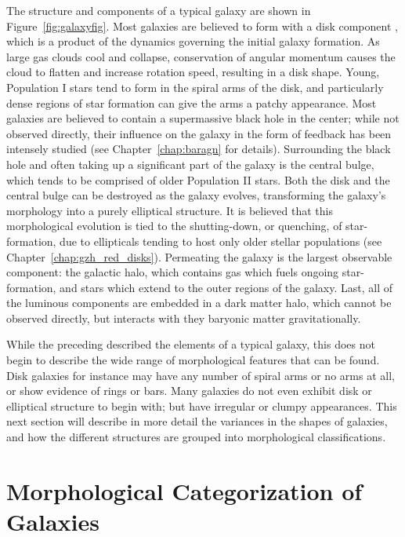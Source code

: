 The structure and components of a typical galaxy are shown in Figure~\ref{fig:galaxyfig}. Most galaxies are believed to form with a disk component \citep{Kormendy2004}, which is a product of the dynamics governing the initial galaxy formation. As large gas clouds cool and collapse, conservation of angular momentum causes the cloud to flatten and increase rotation speed, resulting in a disk shape. Young, Population I stars tend to form in the spiral arms of the disk, and particularly dense regions of star formation can give the arms a patchy appearance. Most galaxies are believed to contain a supermassive black hole in the center; while not observed directly, their influence on the galaxy in the form of feedback has been intensely studied (see Chapter~\ref{chap:baragn} for details). Surrounding the black hole and often taking up a significant part of the galaxy is the central bulge, which tends to be comprised of older Population II stars. Both the disk and the central bulge can be destroyed as the galaxy evolves, transforming the galaxy's morphology into a purely elliptical structure. It is believed that this morphological evolution is tied to the shutting-down, or quenching, of star-formation, due to ellipticals tending to host only older stellar populations (see Chapter~\ref{chap:gzh_red_disks}). Permeating the galaxy is the largest observable component: the galactic halo, which contains gas which fuels ongoing star-formation, and stars which extend to the outer regions of the galaxy. Last, all of the luminous components are embedded in a dark matter halo, which cannot be observed directly, but interacts with they baryonic matter gravitationally. 

While the preceding described the elements of a typical galaxy, this does not begin to describe the wide range of morphological features that can be found. Disk galaxies for instance may have any number of spiral arms or no arms at all, or show evidence of rings or bars. Many galaxies do not even exhibit disk or elliptical structure to begin with; but have irregular or clumpy appearances. This next section will describe in more detail the variances in the shapes of galaxies, and how the different structures are grouped into morphological classifications. 

\section{Morphological Categorization of Galaxies}

